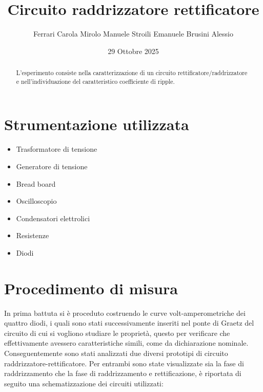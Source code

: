 \documentclass[10pt,twocolumn]{article}
\begin{document}
\justifying
	\title{\textbf{Circuito raddrizzatore rettificatore}}
	\author{ \hspace{0.7cm} Ferrari Carola \hspace{0.7cm} Mirolo Manuele \hspace{0.7cm} Stroili Emanuele \hspace{0.7cm} Brusini Alessio}
	\date{29 Ottobre 2025}
	\maketitle
	\onecolumn
    \tableofcontents
\vspace{11cm}
	\begin{abstract}
		\centering
		\large
    L'esperimento consiste nella caratterizzazione di un circuito 
    rettificatore/raddrizzatore e nell'individuazione del caratteristico 
    coefficiente di ripple.
       
	\end{abstract}

	\newpage
\restoregeometry
\twocolumn

\section{Strumentazione utilizzata}
 \begin{itemize}
    \item Trasformatore di tensione
    \item Generatore di tensione 
    \item Bread board
    \item Oscilloscopio 
    \item Condensatori elettrolici
    \item Resistenze
    \item Diodi 
 \end{itemize}

\vspace{-1cm}
\section{Procedimento di misura}
In prima battuta si è proceduto costruendo le curve 
volt-amperometriche dei quattro diodi, i quali sono stati successivamente inseriti nel 
ponte di Graetz del circuito di cui si vogliono studiare le proprietà, 
questo per verificare che effettivamente avessero caratteristiche simili,
come da dichiarazione nominale. Conseguentemente sono stati analizzati
due diversi prototipi di circuito raddrizzatore-rettificatore.
Per entrambi  sono state visualizzate sia la fase di raddrizzamento
che la fase di raddrizzamento e rettificazione, è riportata di seguito una schematizzazione dei
 circuiti utilizzati:
\end{document}
